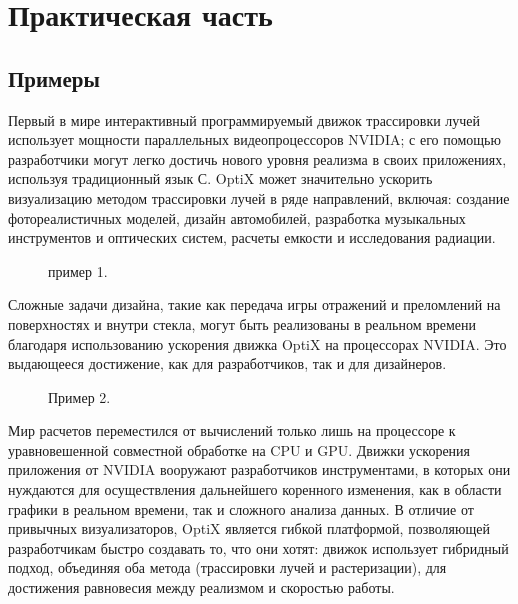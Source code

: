 \section{Практическая часть}
\subsection{Примеры}
Первый в мире интерактивный программируемый движок трассировки лучей использует мощности параллельных видеопроцессоров NVIDIA; с его помощью разработчики могут легко достичь нового уровня реализма в своих приложениях, используя традиционный язык С. OptiX может значительно ускорить визуализацию методом трассировки лучей в ряде направлений, включая: создание фотореалистичных моделей, дизайн автомобилей, разработка музыкальных инструментов и оптических систем, расчеты емкости и исследования радиации.
\begin{figure}[h!]
\caption{пример 1.}
\label{glass}
\end{figure}
 Сложные задачи дизайна, такие как передача игры отражений и преломлений на поверхностях и внутри стекла, могут быть реализованы в реальном времени благодаря использованию ускорения движка OptiX на процессорах NVIDIA. Это выдающееся достижение, как для разработчиков, так и для дизайнеров.
\begin{figure}[h!]
\caption{Пример 2.}
\label{map}
\end{figure}
 Мир расчетов переместился от вычислений только лишь на процессоре к уравновешенной совместной обработке на CPU и GPU. Движки ускорения приложения от NVIDIA вооружают разработчиков инструментами, в которых они нуждаются для осуществления дальнейшего коренного изменения, как в области графики в реальном времени, так и сложного анализа данных. В отличие от привычных визуализаторов, OptiX является гибкой платформой, позволяющей разработчикам быстро создавать то, что они хотят: движок использует гибридный подход, объединяя оба метода (трассировки лучей и растеризации), для достижения равновесия между реализмом и скоростью работы. 
